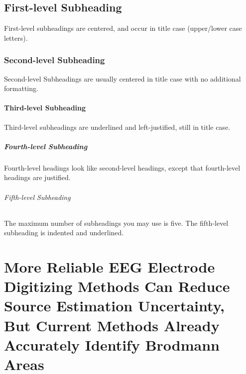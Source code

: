 \documentclass{UCF_ETD}
\begin{document}
\section{First-level Subheading}
First-level subheadings are centered, and occur in title case (upper/lower case letters). 

\subsection{Second-level Subheading}
Second-level Subheadings are usually centered in title case with no additional formatting. 

\subsubsection{Third-level Subheading}
Third-level subheadings are underlined and left-justified, still in title case. 

\paragraph{Fourth-level Subheading}
Fourth-level headings look like second-level headings, except that fourth-level headings are justified.

\subparagraph{Fifth-level Subheading}
The maximum number of subheadings you may use is five.  The fifth-level subheading is indented and underlined. 

\chapter{More Reliable EEG Electrode Digitizing Methods Can Reduce Source Estimation Uncertainty, But Current Methods Already Accurately Identify Brodmann Areas}
\end{document}
